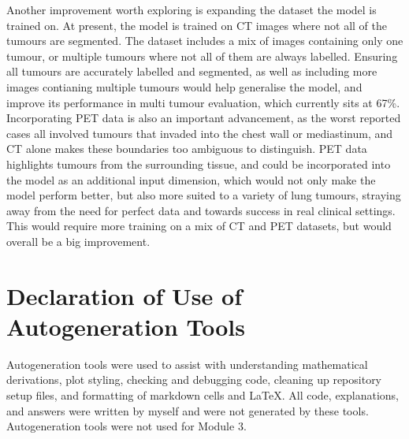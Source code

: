 \documentclass[11pt, a4paper]{article}
\begin{document}
\noindent Another improvement worth exploring is expanding the dataset the model is trained on. 
At present, the model is trained on CT images where not all of the tumours are segmented. 
The dataset includes a mix of images containing only one tumour, or multiple tumours where not all of them are always labelled. 
Ensuring all tumours are accurately labelled and segmented, as well as including more images contianing multiple tumours would help generalise the model, and improve its performance in multi tumour evaluation, which currently sits at 67\%.\\

\noindent Incorporating PET data is also an important advancement, as the worst reported cases all involved tumours that invaded into the chest wall or mediastinum, and CT alone makes these boundaries too ambiguous to distinguish. 
PET data highlights tumours from the surrounding tissue, and could be incorporated into the model as an additional input dimension, which would not only make the model perform better, but also more suited to a variety of lung tumours, straying away from the need for perfect data and towards success in real clinical settings. 
This would require more training on a mix of CT and PET datasets, but would overall be a big improvement.

\section*{Declaration of Use of Autogeneration Tools}

Autogeneration tools were used to assist with understanding mathematical derivations, plot styling, checking and debugging code, cleaning up repository setup files, and formatting of markdown cells and \LaTeX. 
All code, explanations, and answers were written by myself and were not generated by these tools. Autogeneration tools were not used for Module 3.
\end{document}
